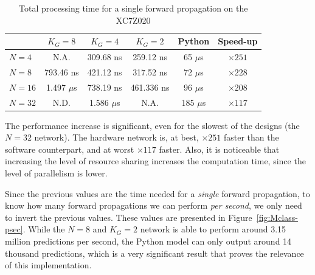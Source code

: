 \begin{table}
    \centering
    \begin{tabular}{ | l | c | c | c | c | c | }
    \hline
    & $K_G=8$  & $K_G=4$ & $K_G=2$ & Python & Speed-up \\
    \hline
    $N=4$ & N.A.  & 309.68 ns  & 259.12 ns & 65 $\mu$s & $\times251$ \\
    \hline
    $N=8$ & 793.46 ns  & 421.12 ns  &  317.52 ns & 72 $\mu$s & $\times228$ \\
    \hline
    $N=16$ & 1.497 $\mu$s  & 738.19 ns  & 461.336 ns & 96 $\mu$s & $\times208$ \\
    \hline
    $N=32$ & N.D.          & 1.586 $\mu$s & N.A.       & 185 $\mu$s  &  $\times117$ \\
		\hline
  \end{tabular}
  \caption{Total processing time for a single forward propagation on the XC7Z020}
  \label{tab:process-time}
\end{table}
The performance increase is significant, even for the slowest of the designs (the $N=32$ network). The hardware network is, at best, $\times251$ faster than the software counterpart,
and at worst $\times117$ faster. Also, it is noticeable that increasing the level of resource sharing increases the computation time, since the level of parallelism is lower.

Since the previous values are the time needed for a \emph{single} forward propagation, to know how many forward propagations we can perform \emph{per second},
we only need to invert the previous values. These values are presented in Figure~\ref{fig:Mclass-psec}. While the $N=8$ and $K_G=2$ network is able to
perform around 3.15 million predictions per second, the Python model can only output around 14 thousand predictions, which is a very significant result that
proves the relevance of this implementation.

